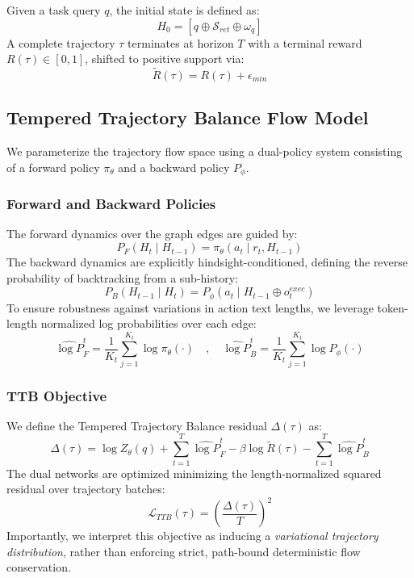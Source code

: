 \documentclass[12pt]{article}
\begin{document}
Given a task query $q$, the initial state is defined as:
\begin{equation}
H_0 = [q \oplus \mathcal{S}_{ret} \oplus \omega_q]
\end{equation}
A complete trajectory $\tau$ terminates at horizon $T$ with a terminal reward $R(\tau) \in [0,1]$, shifted to positive support via:
\begin{equation}
\tilde{R}(\tau) = R(\tau) + \epsilon_{min}
\end{equation}

\subsection{Tempered Trajectory Balance Flow Model}

We parameterize the trajectory flow space using a dual-policy system consisting of a forward policy $\pi_\theta$ and a backward policy $P_\phi$.

\subsubsection{Forward and Backward Policies}
The forward dynamics over the graph edges are guided by:
\begin{equation}
P_F(H_t \mid H_{t-1}) = \pi_\theta(a_t \mid r_t, H_{t-1})
\end{equation}
The backward dynamics are explicitly hindsight-conditioned, defining the reverse probability of backtracking from a sub-history:
\begin{equation}
P_B(H_{t-1} \mid H_t) = P_\phi(a_t \mid H_{t-1} \oplus o_t^{exec})
\end{equation}
To ensure robustness against variations in action text lengths, we leverage token-length normalized log probabilities over each edge:
\begin{equation}
\hat{\log P}_F^t = \frac{1}{K_t} \sum_{j=1}^{K_t} \log \pi_\theta(\cdot)
\quad,\quad
\hat{\log P}_B^t = \frac{1}{K_t} \sum_{j=1}^{K_t} \log P_\phi(\cdot)
\end{equation}

\subsubsection{TTB Objective}
We define the Tempered Trajectory Balance residual $\Delta(\tau)$ as:
\begin{equation}
\Delta(\tau) = \log Z_\theta(q) + \sum_{t=1}^T \hat{\log P}_F^t - \beta \log \tilde{R}(\tau) - \sum_{t=1}^T \hat{\log P}_B^t
\end{equation}
The dual networks are optimized minimizing the length-normalized squared residual over trajectory batches:
\begin{equation}
\mathcal{L}_{TTB}(\tau) = \left(\frac{\Delta(\tau)}{T}\right)^2
\end{equation}
Importantly, we interpret this objective as inducing a \emph{variational trajectory distribution}, rather than enforcing strict, path-bound deterministic flow conservation.
\end{document}
